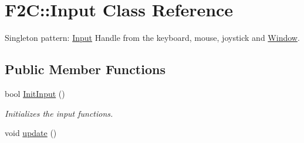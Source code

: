 \hypertarget{class_f2_c_1_1_input}{
\section{F2C::Input Class Reference}
\label{class_f2_c_1_1_input}
}


Singleton pattern: \hyperlink{class_f2_c_1_1_input}{Input} Handle from the keyboard, mouse, joystick and \hyperlink{class_f2_c_1_1_window}{Window}.  
\subsection*{Public Member Functions}
\begin{DoxyCompactItemize}
\item 
bool \hyperlink{class_f2_c_1_1_input_ad5c061a72547198cb6a3f5a1ce44298c}{InitInput} ()
\begin{DoxyCompactList}\small\item\em Initializes the input functions. \item\end{DoxyCompactList}\item 
\hypertarget{class_f2_c_1_1_input_a32e688e7274cd0536c6fb10a85216590}{
void \hyperlink{class_f2_c_1_1_input_a32e688e7274cd0536c6fb10a85216590}{update} ()}
\label{class_f2_c_1_1_input_a32e688e7274cd0536c6fb10a85216590}


\end{DoxyCompactItemize}
